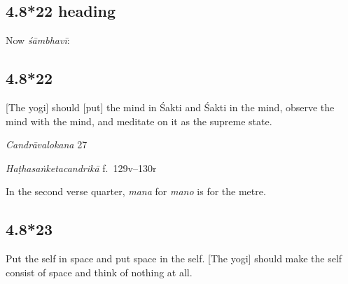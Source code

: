 \begin{ekdosis}
\subsection*{4.8*22 heading}
\begin{translation}[hp04_008_22a]
Now \emph{śāmbhavī}:
\end{translation}


\subsection*{4.8*22}
\begin{translation}[hp04_008_22]
{[}The yogi] should [put] the mind in Śakti and Śakti in the mind, observe the mind with the mind, and meditate on it as the supreme state.
\end{translation}


\begin{sources}[hp04_008_22]
\emph{Candrāvalokana} 27
\begin{versinnote}
\tl{\var{madhyamam ] madhyagaṃ 4340}\\+}
\tl{\var{taṃ dhyāyet ] tad dhyāyet 4340}\\!}
\end{versinnote}
\end{sources}

\begin{testimonia}[hp04_008_22]
\emph{Haṭhasaṅketacandrikā} f.~129v–130r
\begin{versinnote}
\end{versinnote}
\end{testimonia}

\begin{philcomm}[hp04_008_22]
In the second verse quarter, \emph{mana} for \emph{mano} is for the metre.
\end{philcomm}

\subsection*{4.8*23}
\begin{translation}[hp04_008_23]
Put the self in space and put space in the self. [The yogi] should make the self consist of space and think of nothing at all.
\end{translation}


\end{ekdosis}
